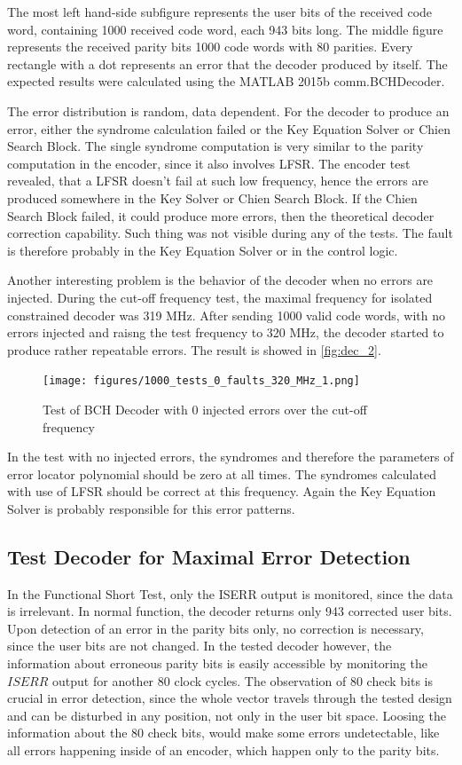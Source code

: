 The most left hand-side subfigure represents the user bits of the received code word, containing 1000 received code word, each 943 bits long. The middle figure represents the received parity bits 1000 code words with 80 parities. Every rectangle with a dot represents an error that the decoder produced by itself. The expected results were calculated using the MATLAB 2015b comm.BCHDecoder.

The error distribution is random, data dependent. For the decoder to produce an error, either the syndrome calculation failed or the Key Equation Solver or Chien Search Block. The single syndrome computation is very similar to the parity computation in the encoder, since it also involves LFSR. The encoder test revealed, that a LFSR doesn't fail at such low frequency, hence the errors are produced somewhere in the Key Solver or Chien Search Block. If the Chien Search Block failed, it could produce more errors, then the theoretical decoder correction capability. Such thing was not visible during any of the tests. The fault is therefore probably in the Key Equation Solver or in the control logic.

Another interesting problem is the behavior of the decoder when no errors are injected. During the cut-off frequency test, the maximal frequency for isolated constrained decoder was 319 MHz. After sending 1000 valid code words, with no errors injected and raisng the test frequency to 320 MHz, the decoder started to produce rather repeatable errors. The result is showed in \autoref{fig:dec_2}.

\begin{figure}[h]
\centering
\texttt{[image: figures/1000\_tests\_0\_faults\_320\_MHz\_1.png]}
\caption{Test of BCH Decoder with 0 injected errors over the cut-off frequency}
\label{fig:dec_2}
\end{figure}

In the test with no injected errors, the syndromes and therefore the parameters of error locator polynomial should be zero at all times. The syndromes calculated with use of LFSR should be correct at this frequency. Again the Key Equation Solver is probably responsible for this error patterns.


\subsection{Test Decoder for Maximal Error Detection}

In the Functional Short Test, only the ISERR output is monitored, since the data is irrelevant. In normal function, the decoder returns only 943 corrected user bits. Upon detection of an error in the parity bits only, no correction is necessary, since the user bits are not changed. In the tested decoder however, the information about erroneous parity bits is easily accessible by monitoring the $ISERR$ output for another 80 clock cycles. The observation of 80 check bits is crucial in error detection, since the whole vector travels through the tested design and can be disturbed in any position, not only in the user bit space. Loosing the information about the 80 check bits, would make some errors undetectable, like all errors happening inside of an encoder, which happen only to the parity bits. 

